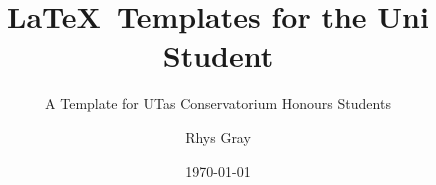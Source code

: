 \documentclass{turabian-thesis}
\title{\LaTeX\ Templates for the Uni Student}
\subtitle{A Template for UTas Conservatorium Honours Students}
\author{Rhys Gray}
\date{\today}
\begin{document}
\frontmatter{}
\maketitle



\tableofcontents{}
\listofillustrations{}

\mainmatter{}



% 
% 


\backmatter{}

\begin{appendixes}
    
    
    
\end{appendixes}

\printbibliography{}
\end{document}

